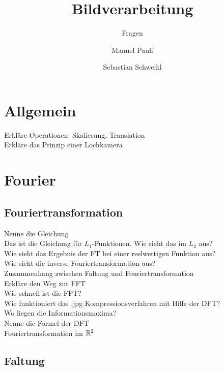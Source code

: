
\usepackage[pdftex]{graphicx}  


\title{Bildverarbeitung}
\subtitle{Fragen}
\author{Manuel Pauli\and{}Sebastian Schweikl}

\maketitle
\section{Allgemein} 
\begin{description}
	\item[Erkläre Operationen: Skalierung, Translation]
	\item[Erkläre das Prinzip einer Lochkamera]
\end{description}	
\section{Fourier}
\subsection{Fouriertransformation}
\begin{description}
	\item[Nenne die Gleichung]
    \item[Das ist die Gleichung für $L_1$-Funktionen. Wie sieht das im $L_2$ aus?]
	\item[Wie sieht das Ergebnis der FT bei einer reelwertigen Funktion aus?]
	\item[Wie sieht die inverse Fouriertransformation aus?]
	\item[Zusammenhang zwischen Faltung und Fouriertransformation]
	\item[Erkläre den Weg zur FFT]
	\item[Wie schnell ist die FFT?]
	\item[Wie funktioniert das .jpg Kompressionsverfahren mit Hilfe der DFT?]
	\item[Wo liegen die Informationsmaxima?]
	\item[Nenne die Formel der DFT]
	\item[Fouriertransformation im $\mathbb{R}^2$]
\end{description}
\subsection{Faltung}
